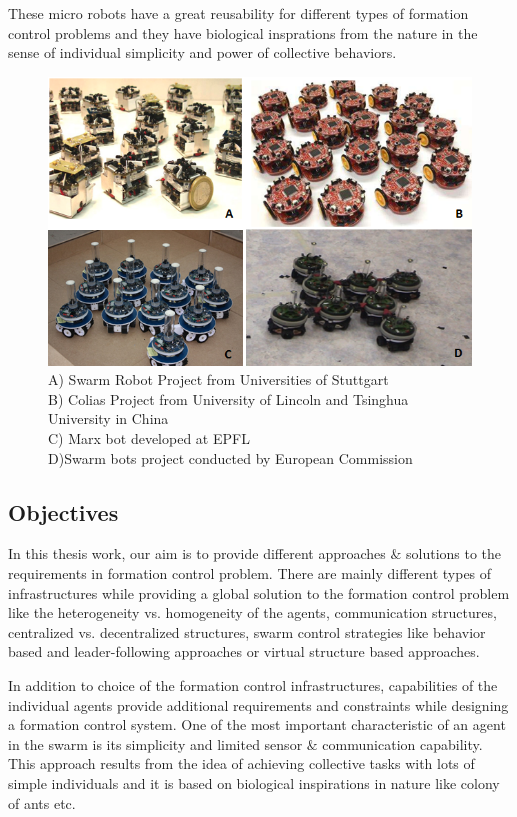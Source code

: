 \documentclass[twoside]{article}
\begin{document}
These micro robots have a great reusability for different types of formation control problems  and they have biological insprations from the nature in the sense of individual simplicity and power of collective behaviors.

	\begin{figure}[H]
		\caption{A) Swarm Robot Project from Universities of Stuttgart  \\
            			B) Colias Project from University of Lincoln and Tsinghua University in China\\
			            C) Marx bot developed at EPFL \\
            			D)Swarm bots project conducted by  European Commission			}
		\centering
		\includegraphics[scale = 1]{mobilerobots}
	\end{figure} 


\subsection{Objectives}


In this thesis work, our aim is to provide different approaches $\&$ solutions to the requirements in formation control problem.  There are mainly different types of  infrastructures while providing a global solution to the formation control problem like the heterogeneity vs. homogeneity of the agents, communication structures, centralized vs. decentralized structures, swarm control strategies like behavior based and leader-following approaches or virtual structure based approaches. 

In addition to choice of the formation control infrastructures, capabilities of the individual agents provide additional requirements and constraints while designing a formation control system. One of the most important characteristic of an agent in the swarm is its simplicity and limited sensor $\&$ communication capability. This approach results from the idea of achieving collective tasks with lots of simple individuals  and it is based on biological inspirations in nature like colony of ants etc.
\end{document}
